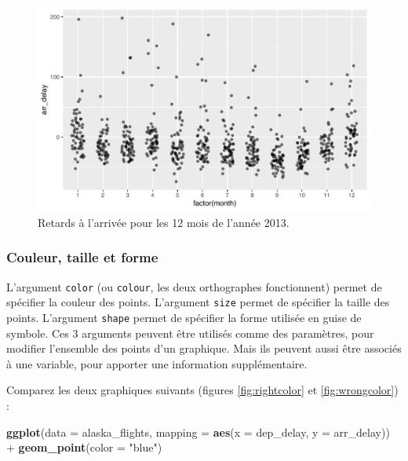 \documentclass[a4paperpaper,]{article}
\newenvironment{Shaded}{\begin{snugshade}}{\end{snugshade}}
\newcommand{\DataTypeTok}[1]{\textcolor[rgb]{0.00,0.34,0.68}{#1}}
\newcommand{\KeywordTok}[1]{\textcolor[rgb]{0.12,0.11,0.11}{\textbf{#1}}}
\newcommand{\NormalTok}[1]{\textcolor[rgb]{0.12,0.11,0.11}{#1}}
\newcommand{\OperatorTok}[1]{\textcolor[rgb]{0.12,0.11,0.11}{#1}}
\newcommand{\StringTok}[1]{\textcolor[rgb]{0.75,0.01,0.01}{#1}}
\begin{document}
\begin{figure}[htpb]

{\centering \includegraphics[width=0.9\linewidth]{figure/unnamed-chunk-42-1} 

}

\caption{Retards à l'arrivée pour les 12 mois de l'année 2013.}\label{fig:unnamed-chunk-42}
\end{figure}

\hypertarget{couleur-taille-et-forme}{%
\subsubsection{Couleur, taille et forme}\label{couleur-taille-et-forme}}

L'argument \texttt{color} (ou \texttt{colour}, les deux orthographes fonctionnent) permet de spécifier la couleur des points. L'argument \texttt{size} permet de spécifier la taille des points. L'argument \texttt{shape} permet de spécifier la forme utilisée en guise de symbole. Ces 3 arguments peuvent être utilisés comme des paramètres, pour modifier l'ensemble des points d'un graphique. Mais ils peuvent aussi être associés à une variable, pour apporter une information supplémentaire.

Comparez les deux graphiques suivants (figures \ref{fig:rightcolor} et \ref{fig:wrongcolor}) :

\begin{Shaded}
\begin{Highlighting}[]
\KeywordTok{ggplot}\NormalTok{(}\DataTypeTok{data =}\NormalTok{ alaska_flights, }\DataTypeTok{mapping =} \KeywordTok{aes}\NormalTok{(}\DataTypeTok{x =}\NormalTok{ dep_delay, }\DataTypeTok{y =}\NormalTok{ arr_delay)) }\OperatorTok{+}
\StringTok{  }\KeywordTok{geom_point}\NormalTok{(}\DataTypeTok{color =} \StringTok{"blue"}\NormalTok{)}
\end{Highlighting}
\end{Shaded}
\end{document}
